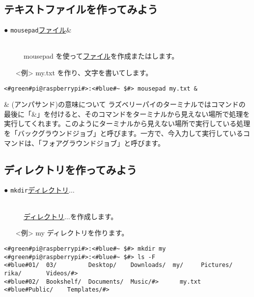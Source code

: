 \subsection{テキストファイルを作ってみよう}
\begin{description}
\item[● \texttt{mousepad}\textvisiblespace \underline{ファイル}\textvisiblespace \&]\mbox{}\\
mousepad を使って\underline{ファイル}を作成またはします。
\end{description}
\begin{itemize}
\item[<例>]my.txt を作り、文字を書いてします。
\end{itemize}
\begin{lstlisting}[caption=mousepadの例, label=mousepad]
<#green#pi@raspberrypi#>:<#blue#~ $#> mousepad my.txt &
\end{lstlisting}

\begin{itembox}[c]{\& (アンパサンド)の意味について}
    ラズベリーパイのターミナルではコマンドの最後に「\&」を付けると、そのコマンドをターミナルから見えない場所で処理を実行してくれます。このようにターミナルから見えない場所で実行している処理を「バックグラウンドジョブ」と呼びます。一方で、今入力して実行しているコマンドは、「フォアグラウンドジョブ」と呼びます。
\end{itembox}

\subsection{ディレクトリを作ってみよう}
\begin{description}
\item[● \texttt{mkdir}\textvisiblespace \underline{ディレクトリ}$\ldots$]\mbox{}\\
\underline{ディレクトリ}$\ldots$を作成します。
\end{description}
\begin{itemize}
\item[<例>]my ディレクトリを作ります。
\end{itemize}
\begin{lstlisting}[caption=mkdirの例, label=mkdir]
<#green#pi@raspberrypi#>:<#blue#~ $#> mkdir my
<#green#pi@raspberrypi#>:<#blue#~ $#> ls -F
<#blue#01/  03/         Desktop/    Downloads/  my/     Pictures/  rika/       Videos/#>
<#blue#02/  Bookshelf/  Documents/  Music/#>      my.txt  <#blue#Public/    Templates/#>
\end{lstlisting}


